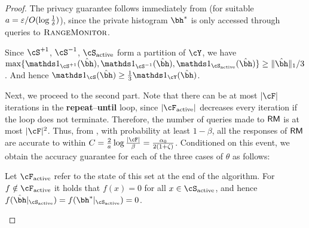 \begin{proof}
The privacy guarantee follows immediately from  (for suitable $a = \varepsilon / O(\log \frac1\delta)$), since the private histogram $\bh^\ast$ is only accessed through queries to $\textsc{RangeMonitor}$.

Since $\Splus$, $\Sminus$, $\Sactive$ form a partition of $\cY$, we have $\max\{ \ind_{\Splus}(\hbh), \ind_{\Sminus}(\hbh), \ind_{\Sactive}(\hbh) \}\geq \|\hbh\|_1/3$. And hence $\ind_{\cS}(\hbh) \geq \frac{1}{3}  \ind_\cY(\hbh)$.

Next, we proceed to the second part. Note that there can be at most $|\cF|$ iterations in the \textbf{repeat}--\textbf{until} loop, since $|\Factive|$ decreases every iteration if the loop does not terminate. Therefore, the number of queries made to $\mathsf{RM}$ is at most $|\cF|^2$. Thus, from , with probability at least $1 - \beta$, all the responses of $\mathsf{RM}$ are accurate to within 
$C = \frac2a \log \frac{|\cF|}{\beta} = \frac{\alpha_0}{2(1+\zeta)}$. 
Conditioned on this event, we obtain the accuracy guarantee for each of the three cases of $\theta$ as follows:
    \begin{description}[leftmargin=5pt]
        \item[{\boldmath Case $\theta=\textsc{Approx}$}:] Let $\Factive$ refer to the state of this set at the end of the algorithm. For $f\notin\Factive$ it holds that $f(x) = 0$ for all $x \in \Sactive$, and hence $f(\hbh|_{\Sactive}) = f(\bh^{\ast}|_{\Sactive}) = 0$.


\end{description}
\end{proof}

